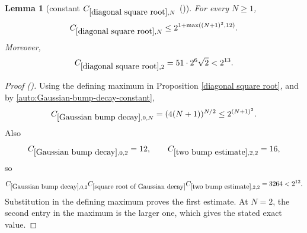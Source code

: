 \documentclass[12pt,reqno]{amsart}
\newcommand{\auto}{{({\tiny\faCar})}}
\theoremstyle{plain}
\newtheorem{lemma}[theorem]{Lemma}
\numberwithin{equation}{section}
\theoremstyle{remark}
\newcommand{\uses}[1]{}
\newcommand{\usesdefs}[1]{}
\begin{document}
\begin{lemma}[constant $C_{\ref{diagonal square root},N}$ \auto]\label{constant diagonal square root}\uses{Gaussian bump decay,two bump estimate,square root of Gaussian decay,diagonal square root}\usesdefs{}
For every $N\ge1$,
\begin{equation}\label{constant diagonal square root bound}
C_{\ref{diagonal square root},N}
\le2^{1+\max((N+1)^2,12)}.
\end{equation}
Moreover,
\begin{equation}\label{auto:constant-diagonal-square-root-two}
C_{\ref{diagonal square root},2}=51\cdot2^6\sqrt2<2^{13}.
\end{equation}
\end{lemma}
\begin{proof}[Proof \auto]
Using the defining maximum in Proposition \ref{diagonal square root}, and by \eqref{auto:Gaussian-bump-decay-constant},
\[
C_{\ref{Gaussian bump decay},0,N}
=(4(N+1))^{N/2}
\le2^{(N+1)^2}.
\]
Also
\[
C_{\ref{Gaussian bump decay},0,2}=12,
\qquad
C_{\ref{two bump estimate},2,2}=16,
\]
so
\[
C_{\ref{Gaussian bump decay},0,2}
C_{\ref{square root of Gaussian decay}}
C_{\ref{two bump estimate},2,2}
=3264<2^{12}.
\]
Substitution in the defining maximum proves the first estimate. At $N=2$, the second entry in the maximum is the larger one, which gives the stated exact value.
\end{proof}
\end{document}
